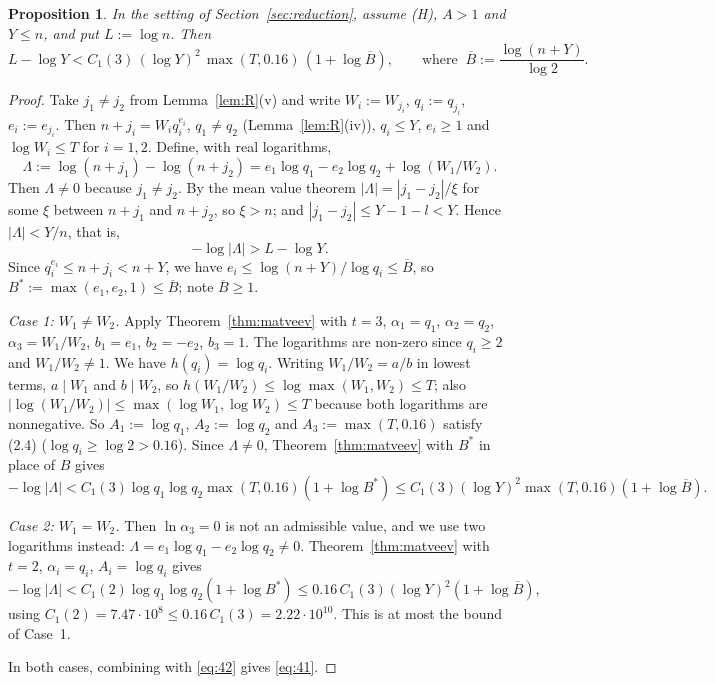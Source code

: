 \documentclass[10pt]{article}
\makeatletter
\numberwithin{equation}{section}
\newtheorem{proposition}[theorem]{Proposition}
\theoremstyle{definition}
\theoremstyle{plain}
\renewcommand\subsection{\@startsection{subsection}{2}{\z@}{-2.2ex \@plus -.6ex \@minus -.2ex}{1ex \@plus .2ex}{\normalfont\normalsize\bfseries}}
\newcommand{\Bbar}{\overline{B}}
\makeatother
\begin{document}
\subsection{Two smooth terms}

\begin{proposition}\label{prop:B}
In the setting of Section~\ref{sec:reduction}, assume \textup{(H)}, $A>1$ and $Y\le n$, and put $L:=\log n$.
Then
\begin{equation}\label{eq:41}
L-\log Y< C_1(3)\,(\log Y)^2\,\max(T,0.16)\,(1+\log\Bbar),\qquad\text{where }\ \Bbar:=\frac{\log(n+Y)}{\log 2}.
\end{equation}
\end{proposition}

\begin{proof}
Take $j_1\ne j_2$ from Lemma~\ref{lem:R}(v) and write $W_i:=W_{j_i}$, $q_i:=q_{j_i}$, $e_i:=e_{j_i}$. Then
$n+j_i=W_iq_i^{e_i}$, $q_1\ne q_2$ (Lemma~\ref{lem:R}(iv)), $q_i\le Y$, $e_i\ge1$ and $\log W_i\le T$ for
$i=1,2$. Define, with real logarithms,
\[
\Lambda:=\log(n+j_1)-\log(n+j_2)=e_1\log q_1-e_2\log q_2+\log(W_1/W_2).
\]
Then $\Lambda\ne0$ because $j_1\ne j_2$. By the mean value theorem $|\Lambda|=|j_1-j_2|/\xi$ for some $\xi$
between $n+j_1$ and $n+j_2$, so $\xi>n$; and $|j_1-j_2|\le Y-1-l<Y$. Hence $|\Lambda|<Y/n$, that is,
\begin{equation}\label{eq:42}
-\log|\Lambda|>L-\log Y.
\end{equation}
Since $q_i^{e_i}\le n+j_i<n+Y$, we have $e_i\le\log(n+Y)/\log q_i\le\Bbar$, so
$B^*:=\max(e_1,e_2,1)\le\Bbar$; note $\Bbar\ge1$.

\emph{Case 1: $W_1\ne W_2$.} Apply Theorem~\ref{thm:matveev} with $t=3$, $\alpha_1=q_1$, $\alpha_2=q_2$,
$\alpha_3=W_1/W_2$, $b_1=e_1$, $b_2=-e_2$, $b_3=1$. The logarithms are non-zero since $q_i\ge2$ and
$W_1/W_2\ne1$. We have $h(q_i)=\log q_i$. Writing $W_1/W_2=a/b$ in lowest terms, $a\mid W_1$ and $b\mid W_2$, so
$h(W_1/W_2)\le\log\max(W_1,W_2)\le T$; also $|\log(W_1/W_2)|\le\max(\log W_1,\log W_2)\le T$ because both
logarithms are nonnegative. So $A_1:=\log q_1$, $A_2:=\log q_2$ and $A_3:=\max(T,0.16)$ satisfy (2.4)
($\log q_i\ge\log2>0.16$). Since $\Lambda\ne0$, Theorem~\ref{thm:matveev} with $B^*$ in place of $B$ gives
\[
-\log|\Lambda|<C_1(3)\log q_1\log q_2\max(T,0.16)(1+\log B^*)\le C_1(3)(\log Y)^2\max(T,0.16)(1+\log\Bbar).
\]

\emph{Case 2: $W_1=W_2$.} Then $\ln\alpha_3=0$ is not an admissible value, and we use two logarithms instead:
$\Lambda=e_1\log q_1-e_2\log q_2\ne0$. Theorem~\ref{thm:matveev} with $t=2$, $\alpha_i=q_i$, $A_i=\log q_i$ gives
\[
-\log|\Lambda|<C_1(2)\log q_1\log q_2(1+\log B^*)\le 0.16\,C_1(3)(\log Y)^2(1+\log\Bbar),
\]
using $C_1(2)=7.47\cdot10^8\le0.16\,C_1(3)=2.22\cdot10^{10}$. This is at most the bound of Case~1.

In both cases, combining with \eqref{eq:42} gives \eqref{eq:41}.
\end{proof}
\end{document}
